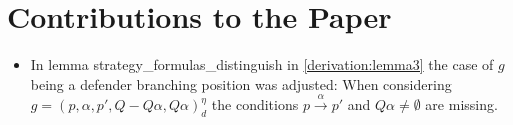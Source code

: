 \section{Contributions to the Paper}

\begin{itemize}
\item In lemma strategy\_formulas\_distinguish in \ref{derivation:lemma3} the case of $g$ being a defender branching position was adjusted: 
When considering $g=(p,\alpha ,p', Q- Q \alpha, Q \alpha)_d^\eta$ the conditions $p \overset{\alpha}{\longrightarrow} p'$ and $Q \alpha \neq \emptyset$ are 
missing. 
\end{itemize}